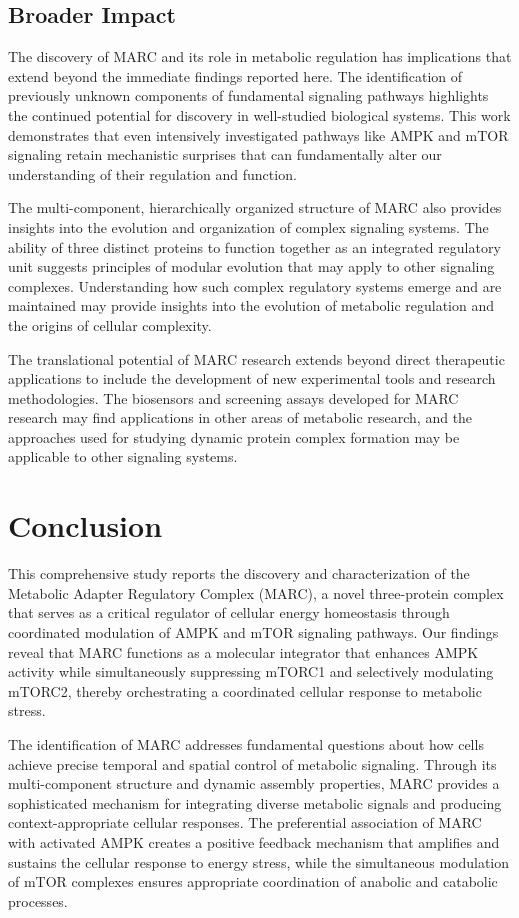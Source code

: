 \documentclass[11pt,a4paper]{article}
\begin{document}
\subsection{Broader Impact}

The discovery of MARC and its role in metabolic regulation has implications that extend beyond the immediate findings reported here. The identification of previously unknown components of fundamental signaling pathways highlights the continued potential for discovery in well-studied biological systems. This work demonstrates that even intensively investigated pathways like AMPK and mTOR signaling retain mechanistic surprises that can fundamentally alter our understanding of their regulation and function.

The multi-component, hierarchically organized structure of MARC also provides insights into the evolution and organization of complex signaling systems. The ability of three distinct proteins to function together as an integrated regulatory unit suggests principles of modular evolution that may apply to other signaling complexes. Understanding how such complex regulatory systems emerge and are maintained may provide insights into the evolution of metabolic regulation and the origins of cellular complexity.

The translational potential of MARC research extends beyond direct therapeutic applications to include the development of new experimental tools and research methodologies. The biosensors and screening assays developed for MARC research may find applications in other areas of metabolic research, and the approaches used for studying dynamic protein complex formation may be applicable to other signaling systems.

\section{Conclusion}

This comprehensive study reports the discovery and characterization of the Metabolic Adapter Regulatory Complex (MARC), a novel three-protein complex that serves as a critical regulator of cellular energy homeostasis through coordinated modulation of AMPK and mTOR signaling pathways. Our findings reveal that MARC functions as a molecular integrator that enhances AMPK activity while simultaneously suppressing mTORC1 and selectively modulating mTORC2, thereby orchestrating a coordinated cellular response to metabolic stress.

The identification of MARC addresses fundamental questions about how cells achieve precise temporal and spatial control of metabolic signaling. Through its multi-component structure and dynamic assembly properties, MARC provides a sophisticated mechanism for integrating diverse metabolic signals and producing context-appropriate cellular responses. The preferential association of MARC with activated AMPK creates a positive feedback mechanism that amplifies and sustains the cellular response to energy stress, while the simultaneous modulation of mTOR complexes ensures appropriate coordination of anabolic and catabolic processes.
\end{document}
